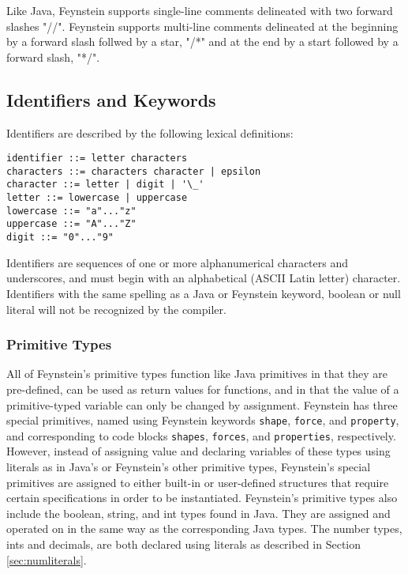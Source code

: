 \documentclass[letterpaper]{article}
\begin{document}
Like Java, Feynstein supports single-line comments delineated with two
forward slashes "//". Feynstein supports multi-line comments
delineated at the beginning by a forward slash follwed by a star, "/*"
and at the end by a start followed by a forward slash, "*/".
 
\subsection{Identifiers and Keywords}

Identifiers are described by the following lexical definitions:

\begin{verbatim}
identifier ::= letter characters
characters ::= characters character | epsilon
character ::= letter | digit | '\_'
letter ::= lowercase | uppercase
lowercase ::= "a"..."z"
uppercase ::= "A"..."Z"
digit ::= "0"..."9"
\end{verbatim}

Identifiers are sequences of one or more alphanumerical characters and
underscores, and must begin with an alphabetical (ASCII Latin letter)
character.  Identifiers with the same spelling as a Java or Feynstein
keyword, boolean or null literal will not be recognized by the
compiler.

\subsubsection{Primitive Types}
All of Feynstein's primitive types function like Java primitives in
that they are pre-defined, can be used as return values for functions,
and in that the value of a primitive-typed variable can only be
changed by assignment.  Feynstein has three special primitives, named
using Feynstein keywords \texttt{shape}, \texttt{force}, and \texttt{property}, and
corresponding to code blocks \texttt{shapes}, \texttt{forces}, and \texttt{properties},
respectively.  However, instead of assigning value and declaring
variables of these types using literals as in Java's or Feynstein's
other primitive types, Feynstein's special primitives are assigned to
either built-in or user-defined structures that require certain
specifications in order to be instantiated.  Feynstein's primitive
types also include the boolean, string, and int types found in Java.
They are assigned and operated on in the same way as the corresponding
Java types.  The number types, ints and decimals, are both declared
using literals as described in Section \ref{sec:numliterals}.
\end{document}
